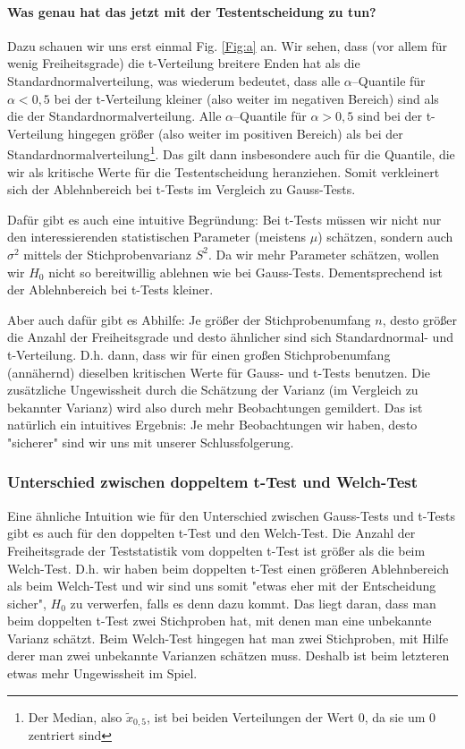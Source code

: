 \documentclass[a4paper]{article}
\begin{document}
\paragraph{Was genau hat das jetzt mit der Testentscheidung zu tun?} Dazu schauen wir uns erst einmal Fig. \ref{Fig:a} an. Wir sehen, dass (vor allem für wenig Freiheitsgrade) die t-Verteilung breitere Enden hat als die Standardnormalverteilung, was wiederum bedeutet, dass alle $\alpha$--Quantile für $\alpha < 0,5$ bei der t-Verteilung kleiner (also weiter im negativen Bereich) sind als die der Standardnormalverteilung. Alle $\alpha$--Quantile für $\alpha > 0,5$ sind bei der t-Verteilung hingegen größer (also weiter im positiven Bereich) als bei der Standardnormalverteilung\footnote{Der Median, also $\tilde{x}_{0,5}$, ist bei beiden Verteilungen der Wert 0, da sie um 0 zentriert sind}. Das gilt dann insbesondere auch für die Quantile, die wir als kritische Werte für die Testentscheidung heranziehen. Somit verkleinert sich der Ablehnbereich bei t-Tests im Vergleich zu Gauss-Tests.

\noindent Dafür gibt es auch eine intuitive Begründung: Bei t-Tests müssen wir nicht nur den interessierenden statistischen Parameter (meistens $\mu$) schätzen, sondern auch $\sigma^2$ mittels der Stichprobenvarianz $S^2$. Da wir mehr Parameter schätzen, wollen wir $H_0$ nicht so bereitwillig ablehnen wie bei Gauss-Tests. Dementsprechend ist der Ablehnbereich bei t-Tests kleiner.

\noindent Aber auch dafür gibt es Abhilfe: Je größer der Stichprobenumfang $n$, desto größer die Anzahl der Freiheitsgrade und desto ähnlicher sind sich Standardnormal- und t-Verteilung. D.h. dann, dass wir für einen großen Stichprobenumfang (annähernd) dieselben kritischen Werte für Gauss- und t-Tests benutzen. Die zusätzliche Ungewissheit durch die Schätzung der Varianz (im Vergleich zu bekannter Varianz) wird also durch mehr Beobachtungen gemildert. Das ist natürlich ein intuitives Ergebnis: Je mehr Beobachtungen wir haben, desto "sicherer" sind wir uns mit unserer Schlussfolgerung.

\subsubsection{Unterschied zwischen doppeltem t-Test und Welch-Test}\label{sec:t2vsWelch}
Eine ähnliche Intuition wie für den Unterschied zwischen Gauss-Tests und t-Tests gibt es auch für den doppelten t-Test und den Welch-Test. Die Anzahl der Freiheitsgrade der Teststatistik vom doppelten t-Test ist größer als die beim Welch-Test. D.h. wir haben beim doppelten t-Test einen größeren Ablehnbereich als beim Welch-Test und wir sind uns somit "etwas eher mit der Entscheidung sicher", $H_0$ zu verwerfen, falls es denn dazu kommt. Das liegt daran, dass man beim doppelten t-Test zwei Stichproben hat, mit denen man eine unbekannte Varianz schätzt. Beim Welch-Test hingegen hat man zwei Stichproben, mit Hilfe derer man zwei unbekannte Varianzen schätzen muss. Deshalb ist beim letzteren etwas mehr Ungewissheit im Spiel.
\end{document}
